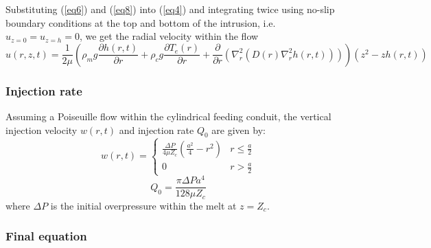 \begin{article}
        Substituting (\ref{eq6}) and  (\ref{eq8}) into (\ref{eq4}) and
        integrating twice using no-slip boundary conditions at the top
        and bottom of the  intrusion, i.e. $u_{z=0}=u_{z=h}=0$, we get
        the radial velocity within the flow
\begin{equation}
  u(r,z,t)= \frac{1}{2\mu}\left(\rho_{m}g \frac{\partial h(r,t)}{\partial r} + \rho_{c}g \frac{\partial T_e(r)}{\partial r}+\frac{\partial}{\partial r}\left ( \nabla^{2}_{r}(D(r)\nabla^{2}_{r}h(r,t))\right)\right) (z^{2}-zh(r,t))
  \label{eq10}
\end{equation}

\subsubsection{Injection rate}
\label{Injection_Rate}

Assuming a Poiseuille flow within the cylindrical feeding conduit, the
vertical  injection velocity  $w(r,t)$  and injection  rate $Q_0$  are
given by:
\begin{equation*}
  w(r,t)=
  \begin{cases}
    \frac{ \Delta P}{4 \mu Z_{c}} (\frac{a^{2}}{4}-r^{2})& r \le \frac{a}{2}\\
    0 & r > \frac{a}{2}
  \end{cases}
  \label{eq12}
\end{equation*}
\begin{equation}
  Q_{0}=\frac{\pi \Delta P a^{4}}{128 \mu Z_c}
  \label{eq11}
\end{equation}
where  $\Delta P$  is  the  initial overpressure  within  the melt  at
$z=Z_{c}$.

\subsubsection{Final equation}
\label{Final_Equation}


\end{article}
